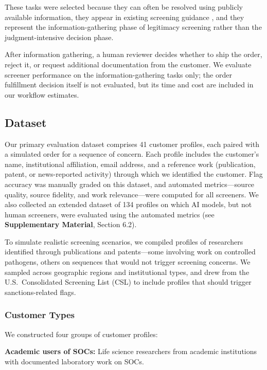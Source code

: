 \documentclass[utf8]{FrontiersinHarvard}
\begin{document}
These tasks were selected because they can often be resolved using publicly available information, they appear in existing screening guidance \citep{Alexanian2024}, and they represent the information-gathering phase of legitimacy screening rather than the judgment-intensive decision phase.

After information gathering, a human reviewer decides whether to ship the order, reject it, or request additional documentation from the customer. We evaluate screener performance on the information-gathering tasks only; the order fulfillment decision itself is not evaluated, but its time and cost are included in our workflow estimates.

\subsection{Dataset}

Our primary evaluation dataset comprises 41 customer profiles, each paired with a simulated order for a sequence of concern. Each profile includes the customer's name, institutional affiliation, email address, and a reference work (publication, patent, or news-reported activity) through which we identified the customer.
Flag accuracy was manually graded on this dataset, and automated metrics---source quality, source fidelity, and work relevance---were computed for all screeners. We also collected an extended dataset of 134 profiles on which AI models, but not human screeners, were evaluated using the automated metrics (see \textbf{Supplementary Material}, Section 6.2).

To simulate realistic screening scenarios, we compiled profiles of researchers identified through publications and patents---some involving work on controlled pathogens, others on sequences that would not trigger screening concerns. We sampled across geographic regions and institutional types, and drew from the U.S.\ Consolidated Screening List (CSL) to include profiles that should trigger sanctions-related flags.

\subsubsection{Customer Types}

We constructed four groups of customer profiles:

\textbf{Academic users of SOCs:} Life science researchers from academic institutions with documented laboratory work on SOCs.
\end{document}
